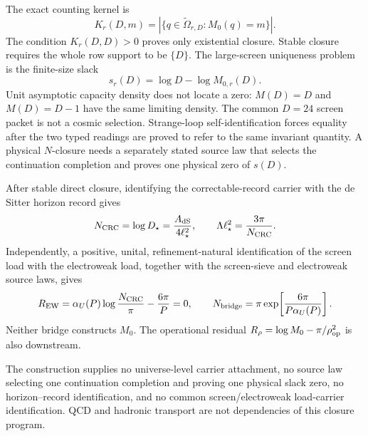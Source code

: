 \begin{remark}
\label{rem:self-closure-counting-target}
The exact counting kernel is
\[
K_r(D,m)=
|\{q\in\widetilde\Omega_{r,D}:M_0(q)=m\}|.
\]
The condition \(K_r(D,D)>0\) proves only existential closure. Stable closure
requires the whole row support to be \(\{D\}\). The large-screen uniqueness
problem is the finite-size slack
\[
\boxed{s_r(D)=\log D-\log M_{0,r}(D)}.
\]
Unit asymptotic capacity density does not locate a zero: \(M(D)=D\) and
\(M(D)=D-1\) have the same limiting density. The common \(D=24\) screen
packet is not a cosmic selection. Strange-loop self-identification forces
equality after the two typed readings are proved to refer to the same
invariant quantity. A physical \(N\)-closure needs a separately stated source
law that selects the continuation completion and proves one physical zero of
\(s(D)\).

After stable direct closure, identifying the correctable-record carrier with
the de Sitter horizon record gives
\[
N_{\rm CRC}=\log D_\star=\frac{A_{\rm dS}}{4\ell_\star^2},
\qquad
\Lambda\ell_\star^2=\frac{3\pi}{N_{\rm CRC}}.
\]
Independently, a positive, unital, refinement-natural identification of the
screen load with the electroweak load, together with the screen-sieve and
electroweak source laws, gives
\[
R_{\rm EW}=
\alpha_U(P)\log\frac{N_{\rm CRC}}{\pi}-\frac{6\pi}{P}=0,
\qquad
N_{\rm bridge}=
\pi\exp\!\left[\frac{6\pi}{P\alpha_U(P)}\right].
\]
Neither bridge constructs \(M_0\). The operational residual
\(R_\rho=\log M_0-\pi/\rho_{\rm op}^2\) is also downstream.

The construction supplies no universe-level carrier attachment, no source
law selecting one continuation completion and proving one physical slack
zero, no horizon--record identification, and no common
screen/electroweak load-carrier identification. QCD
and hadronic transport are not dependencies of this closure program.
\end{remark}
